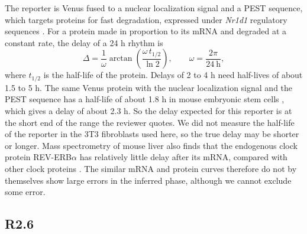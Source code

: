 The reporter is Venus fused to a nuclear localization signal and a PEST sequence, which targets proteins for fast degradation, expressed under \textit{Nr1d1} regulatory sequences \cite{nagoshi_circadian_2004}. For a protein made in proportion to its mRNA and degraded at a constant rate, the delay of a 24 h rhythm is
\begin{equation}
\Delta = \frac{1}{\omega}\arctan\!\left(\frac{\omega\, t_{1/2}}{\ln 2}\right), \qquad \omega = \frac{2\pi}{24~\text{h}},
\end{equation}
where $t_{1/2}$ is the half-life of the protein. Delays of 2 to 4 h need half-lives of about 1.5 to 5 h. The same Venus protein with the nuclear localization signal and the PEST sequence has a half-life of about 1.8 h in mouse embryonic stem cells \cite{abranches_generation_2013}, which gives a delay of about 2.3 h. So the delay expected for this reporter is at the short end of the range the reviewer quotes. We did not measure the half-life of the reporter in the 3T3 fibroblasts used here, so the true delay may be shorter or longer. Mass spectrometry of mouse liver also finds that the endogenous clock protein REV-ERB$\alpha$ has relatively little delay after its mRNA, compared with other clock proteins \cite{narumi_mass_2016}. The similar mRNA and protein curves therefore do not by themselves show large errors in the inferred phase, although we cannot exclude some error.


\subsection*{R2.6}


